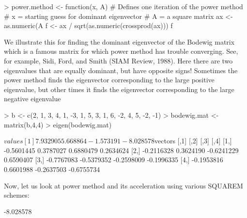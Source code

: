 \documentclass[english]{article}
\begin{document}
\begin{Schunk}
\begin{Sinput}
> power.method <- function(x, A) {
  # Defines one iteration of the power method
  # x = starting guess for dominant eigenvector
  # A = a square matrix
  ax <- as.numeric(A %*% x)
  f <- ax / sqrt(as.numeric(crossprod(ax)))
  f
  }
\end{Sinput}
\end{Schunk}

We illustrate this for finding the dominant eigenvector of the Bodewig matrix which is a famous matrix for which power method has trouble converging.  See, for example, Sidi, Ford, and Smith (SIAM Review, 1988).  Here there are two eigenvalues that are equally dominant, but have opposite signs! Sometimes the power method finds the eigenvector corresponding to the large positive eigenvalue, but other times it finds the eigenvector corresponding to the large negative eigenvalue

\begin{Schunk}
\begin{Sinput}
> b <- c(2, 1, 3, 4, 1,  -3,   1,   5,  3,   1,   6,  -2,  4,   5,  -2,  -1)
> bodewig.mat <- matrix(b,4,4)
> eigen(bodewig.mat)
\end{Sinput}
\begin{Soutput}
$values
[1]  7.932905  5.668864 -1.573191 -8.028578

$vectors
           [,1]       [,2]       [,3]       [,4]
[1,] -0.5601445  0.3787027  0.6880479  0.2634624
[2,] -0.2116328  0.3624190 -0.6241229  0.6590407
[3,] -0.7767083 -0.5379352 -0.2598009 -0.1996335
[4,] -0.1953816  0.6601988 -0.2637503 -0.6755734
\end{Soutput}
\end{Schunk}

Now, let us look at power method and its acceleration using various SQUAREM schemes:

\begin{Schunk}
\begin{Soutput}
[1] -8.028578
\end{Soutput}
\end{Schunk}
\end{document}
